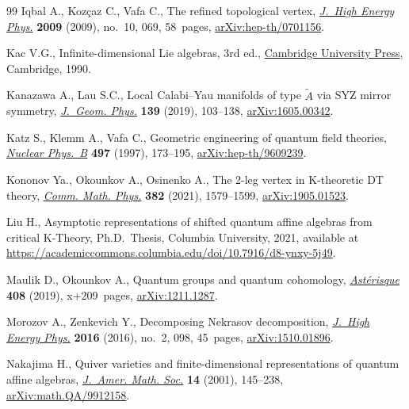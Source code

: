 \documentclass[pdftex]{sigma}%
\numberwithin{equation}{section}
\renewcommand{\tilde}[1]{\widetilde{#1}}
\begin{document}
\begin{thebibliography}{99}
Iqbal A., Koz\c{c}az C., Vafa C., The refined topological vertex,
 \href{https://doi.org/10.1088/1126-6708/2009/10/069}{\textit{J.~High Energy Phys.}} \textbf{2009} (2009), no.~10, 069, 58~pages,
 \href{https://arxiv.org/abs/hep-th/0701156}{arXiv:hep-th/0701156}.

Kac V.G., Infinite-dimensional {L}ie algebras, 3rd ed., \href{https://doi.org/10.1017/CBO9780511626234}{Cambridge University
 Press}, Cambridge, 1990.

Kanazawa A., Lau S.C., Local {C}alabi--{Y}au manifolds of type $\tilde{A}$ via
 {SYZ} mirror symmetry, \href{https://doi.org/10.1016/j.geomphys.2018.12.015}{\textit{J.~Geom. Phys.}} \textbf{139} (2019), 103--138,
 \href{https://arxiv.org/abs/1605.00342}{arXiv:1605.00342}.

Katz S., Klemm A., Vafa C., Geometric engineering of quantum field theories,
 \href{https://doi.org/10.1016/S0550-3213(97)00282-4}{\textit{Nuclear Phys.~B}} \textbf{497} (1997), 173--195,
 \href{https://arxiv.org/abs/hep-th/9609239}{arXiv:hep-th/9609239}.

Kononov Ya., Okounkov A., Osinenko A., The 2-leg vertex in {K}-theoretic {DT}
 theory, \href{https://doi.org/10.1007/s00220-021-03936-z}{\textit{Comm. Math. Phys.}} \textbf{382} (2021), 1579--1599,
 \href{https://arxiv.org/abs/1905.01523}{arXiv:1905.01523}.

Liu H., Asymptotic representations of shifted quantum affine algebras from
 critical {K}-Theory, Ph.D.~Thesis, {C}olumbia University, 2021, available at
 \url{https://academiccommons.columbia.edu/doi/10.7916/d8-ynxy-5j49}.

Maulik D., Okounkov A., Quantum groups and quantum cohomology,
 \href{https://doi.org/10.24033/ast.1074}{\textit{Ast\'erisque}} \textbf{408} (2019), x+209~pages, \href{https://arxiv.org/abs/1211.1287}{arXiv:1211.1287}.

Morozov A., Zenkevich Y., Decomposing {N}ekrasov decomposition, \href{https://doi.org/10.1007/JHEP02(2016)098}{\textit{J.~High
 Energy Phys.}} \textbf{2016} (2016), no.~2, 098, 45~pages,
 \href{https://arxiv.org/abs/1510.01896}{arXiv:1510.01896}.

Nakajima H., Quiver varieties and finite-dimensional representations of quantum
 affine algebras, \href{https://doi.org/10.1090/S0894-0347-00-00353-2}{\textit{J.~Amer. Math. Soc.}} \textbf{14} (2001), 145--238,
 \href{https://arxiv.org/abs/math.QA/9912158}{arXiv:math.QA/9912158}.


\end{thebibliography}
\end{document}
